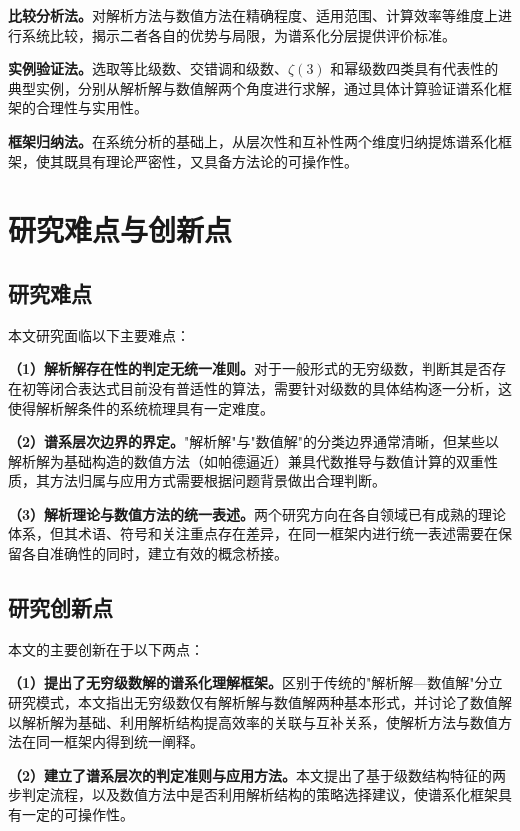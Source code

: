 \textbf{比较分析法。}对解析方法与数值方法在精确程度、适用范围、计算效率等维度上进行系统比较，揭示二者各自的优势与局限，为谱系化分层提供评价标准。

\textbf{实例验证法。}选取等比级数、交错调和级数、$\zeta(3)$ 和幂级数四类具有代表性的典型实例，分别从解析解与数值解两个角度进行求解，通过具体计算验证谱系化框架的合理性与实用性。

\textbf{框架归纳法。}在系统分析的基础上，从层次性和互补性两个维度归纳提炼谱系化框架，使其既具有理论严密性，又具备方法论的可操作性。

\section{研究难点与创新点}

\subsection{研究难点}

本文研究面临以下主要难点：

\textbf{（1）解析解存在性的判定无统一准则。}对于一般形式的无穷级数，判断其是否存在初等闭合表达式目前没有普适性的算法，需要针对级数的具体结构逐一分析，这使得解析解条件的系统梳理具有一定难度。

\textbf{（2）谱系层次边界的界定。}"解析解"与"数值解"的分类边界通常清晰，但某些以解析解为基础构造的数值方法（如帕德逼近）兼具代数推导与数值计算的双重性质，其方法归属与应用方式需要根据问题背景做出合理判断。

\textbf{（3）解析理论与数值方法的统一表述。}两个研究方向在各自领域已有成熟的理论体系，但其术语、符号和关注重点存在差异，在同一框架内进行统一表述需要在保留各自准确性的同时，建立有效的概念桥接。

\subsection{研究创新点}

本文的主要创新在于以下两点：

\textbf{（1）提出了无穷级数解的谱系化理解框架。}区别于传统的"解析解—数值解"分立研究模式，本文指出无穷级数仅有解析解与数值解两种基本形式，并讨论了数值解以解析解为基础、利用解析结构提高效率的关联与互补关系，使解析方法与数值方法在同一框架内得到统一阐释。

\textbf{（2）建立了谱系层次的判定准则与应用方法。}本文提出了基于级数结构特征的两步判定流程，以及数值方法中是否利用解析结构的策略选择建议，使谱系化框架具有一定的可操作性。

